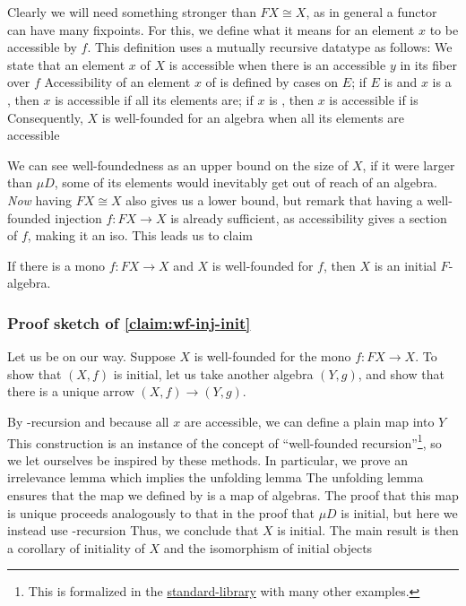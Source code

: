 Clearly we will need something stronger than $FX \cong X$, as in general a functor can have many fixpoints. For this, we define what it means for an element $x$ to be accessible by $f$. This definition uses a mutually recursive datatype as follows:
We state that an element $x$ of $X$ is accessible when there is an accessible $y$ in its fiber over $f$
Accessibility of an element $x$ of  is defined by cases on $E$; if $E$ is  and $x$ is a , then $x$ is accessible if all its elements are; if $x$ is , then $x$ is accessible if  is
Consequently, $X$ is well-founded for an algebra when all its elements are accessible

We can see well-foundedness as an upper bound on the size of $X$, if it were larger than $\mu D$, some of its elements would inevitably get out of reach of an algebra. \textit{Now} having $FX \cong X$ also gives us a lower bound, but remark that having a well-founded injection $f: FX \to X$ is already sufficient, as accessibility gives a section of $f$, making it an iso. This leads us to claim
\begin{claim}\label{claim:wf-inj-init}
    If there is a mono $f : FX \to X$ and $X$ is well-founded for $f$, then $X$ is an initial $F$-algebra.
\end{claim}

\subsubsection{Proof sketch of \autoref{claim:wf-inj-init}}
Let us be on our way. Suppose $X$ is well-founded for the mono $f : FX \to X$. To show that $(X, f)$ is initial, let us take another algebra $(Y, g)$, and show that there is a unique arrow $(X, f) \to (Y, g)$.

By -recursion and because all $x$ are accessible, we can define a plain map into $Y$
This construction is an instance of the concept of ``well-founded recursion''\footnote{This is formalized in the \href{https://agda.github.io/agda-stdlib/Induction.WellFounded.html}{standard-library} with many other examples.}, so we let ourselves be inspired by these methods. In particular, we prove an irrelevance lemma
which implies the unfolding lemma
The unfolding lemma ensures that the map we defined by  is a map of algebras. The proof that this map is unique proceeds analogously to that in the proof that $\mu D$ is initial, but here we instead use -recursion
Thus, we conclude that $X$ is initial. The main result is then a corollary of initiality of $X$ and the isomorphism of initial objects


